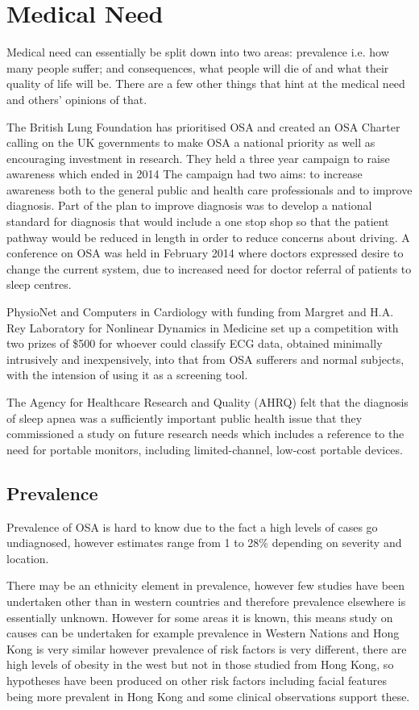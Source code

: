 \section{Medical Need}
\label{sec:medicalneed-sophie}
Medical need can essentially be split down into two areas: prevalence i.e. how many people suffer; and consequences, what people will die of and what their quality of life will be. There are a few other things that hint at the medical need and others’ opinions of that. 

The British Lung Foundation has prioritised OSA and created an OSA Charter calling on the UK governments to make OSA a national priority as well as encouraging investment in research. They held a three year campaign to raise awareness which ended in 2014 The campaign had two aims: to increase awareness both to the general public and health care professionals and to improve diagnosis. Part of the plan to improve diagnosis was to develop a national standard for diagnosis that would include a one stop shop so that the patient pathway would be reduced in length in order to reduce concerns about driving. A conference on OSA was held in February 2014 where doctors expressed desire to change the current system, due to increased need for doctor referral of patients to sleep centres. 

PhysioNet and Computers in Cardiology with funding from Margret and H.A. Rey Laboratory for Nonlinear Dynamics in Medicine set up a competition with two prizes of \$500 for whoever could classify ECG data, obtained minimally intrusively and inexpensively, into that from OSA sufferers and normal subjects, with the intension of using it as a screening tool. 

The Agency for Healthcare Research and Quality (AHRQ) felt that the diagnosis of sleep apnea was a sufficiently important public health issue that they commissioned a study on future research needs which includes a reference to the need for portable monitors, including limited-channel, low-cost portable devices.

\subsection{Prevalence}

Prevalence of OSA is hard to know due to the fact a high levels of cases go undiagnosed, however estimates range from 1 to 28\% depending on severity and location. 

There may be an ethnicity element in prevalence, however few studies have been undertaken other than in western countries and therefore prevalence elsewhere is essentially unknown. However for some areas it is known, this means study on causes can be undertaken for example prevalence in Western Nations and Hong Kong is very similar however prevalence of risk factors is very different, there are high levels of obesity in the west but not in those studied from Hong Kong, so hypotheses have been produced on other risk factors including facial features being more prevalent in Hong Kong and some clinical observations support these. 

